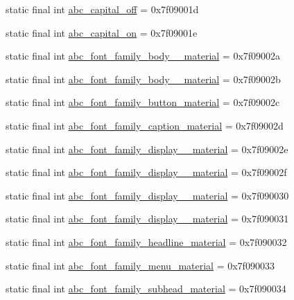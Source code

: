 \begin{CompactItemize}
\item 
static final int \hyperlink{classandroid_1_1support_1_1v4_1_1_r_1_1string_17b4ba0559f70c0122c48b1e668c43cf}{abc\_\-capital\_\-off} = 0x7f09001d
\item 
static final int \hyperlink{classandroid_1_1support_1_1v4_1_1_r_1_1string_663ee9509ec4813df876c4f6c8f6956c}{abc\_\-capital\_\-on} = 0x7f09001e
\item 
static final int \hyperlink{classandroid_1_1support_1_1v4_1_1_r_1_1string_28f27eda1b397e2cc8e2a2319e553138}{abc\_\-font\_\-family\_\-body\_\_\-material} = 0x7f09002a
\item 
static final int \hyperlink{classandroid_1_1support_1_1v4_1_1_r_1_1string_fc1011661fe411f980517837482c924c}{abc\_\-font\_\-family\_\-body\_\_\-material} = 0x7f09002b
\item 
static final int \hyperlink{classandroid_1_1support_1_1v4_1_1_r_1_1string_56980371d139ab3ee0925673f51a20ef}{abc\_\-font\_\-family\_\-button\_\-material} = 0x7f09002c
\item 
static final int \hyperlink{classandroid_1_1support_1_1v4_1_1_r_1_1string_7d5ba6ecda6e3d5515995ea52432959d}{abc\_\-font\_\-family\_\-caption\_\-material} = 0x7f09002d
\item 
static final int \hyperlink{classandroid_1_1support_1_1v4_1_1_r_1_1string_cbf4f7af92a24f86721862336fd4734a}{abc\_\-font\_\-family\_\-display\_\_\-material} = 0x7f09002e
\item 
static final int \hyperlink{classandroid_1_1support_1_1v4_1_1_r_1_1string_66d1c7807510c41f4dc05d6025a14d68}{abc\_\-font\_\-family\_\-display\_\_\-material} = 0x7f09002f
\item 
static final int \hyperlink{classandroid_1_1support_1_1v4_1_1_r_1_1string_a6160f910e19142b27c68cc58e4b8eee}{abc\_\-font\_\-family\_\-display\_\_\-material} = 0x7f090030
\item 
static final int \hyperlink{classandroid_1_1support_1_1v4_1_1_r_1_1string_a14d3727adb6bbd1fe4ea7512bf0500a}{abc\_\-font\_\-family\_\-display\_\_\-material} = 0x7f090031
\item 
static final int \hyperlink{classandroid_1_1support_1_1v4_1_1_r_1_1string_607c49fcd87a59eaa2a587feeba6438b}{abc\_\-font\_\-family\_\-headline\_\-material} = 0x7f090032
\item 
static final int \hyperlink{classandroid_1_1support_1_1v4_1_1_r_1_1string_19c86b39d81958b6d84bb5a2059933c9}{abc\_\-font\_\-family\_\-menu\_\-material} = 0x7f090033
\item 
static final int \hyperlink{classandroid_1_1support_1_1v4_1_1_r_1_1string_1420ad3077e1f5a5619fabebfe7ba6e5}{abc\_\-font\_\-family\_\-subhead\_\-material} = 0x7f090034

\end{CompactItemize}
